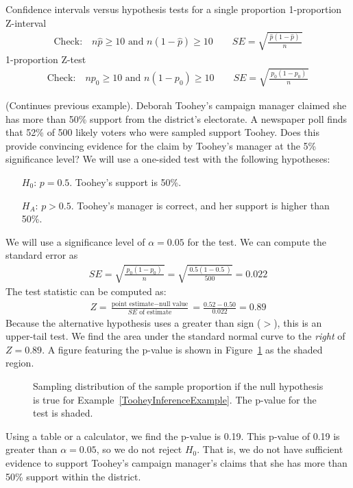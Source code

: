 \begin{onebox}{Confidence intervals versus hypothesis tests for a single proportion}
1-proportion Z-interval
\begin{align*}
\text{Check:}\quad n\hat{p}\ge 10 \text{ and }n(1-\hat{p})\ge 10 \qquad SE = \sqrt{\frac{\ \hat{p}(1-\hat{p})\ }{n}}
\end{align*}
1-proportion Z-test
\begin{align*}
\text{Check:}\quad  np_0\ge 10 \text{ and } n(1-p_0)\ge 10 \qquad SE = \sqrt{\frac{\ p_0(1-p_0)\ }{n}}
\end{align*}
\end{onebox}


\begin{examplewrap}
\begin{nexample}{(Continues previous example). Deborah Toohey's campaign manager claimed she has more than 50\% support from the district's electorate. A newspaper poll finds that 52\% of 500 likely voters who were sampled support Toohey. Does this provide convincing evidence for the claim by Toohey's manager at the 5\% significance level?}\label{TooheyInferenceExample}
We will use a one-sided test with the following hypotheses:
\begin{itemize}
\item[$H_0$:] $p = 0.5$. Toohey's support is 50\%.
\item[$H_A$:] $p > 0.5$. Toohey's manager is correct, and her support is higher than 50\%.
\end{itemize}
We will use a significance level of $\alpha = 0.05$ for the test. We can compute the standard error as
\begin{align*}
SE = \sqrt{\frac{\ p_0 (1 - p_0)\ }{n}} = \sqrt{\frac{\ 0.5 (1 - 0.5\ )}{500}} = 0.022
\end{align*}
The test statistic can be computed as:
\begin{align*}
Z =  \frac{\text{point estimate} - \text{null value}}{SE \text{ of estimate}} = \frac{0.52 - 0.50}{0.022} = 0.89
\end{align*}
Because the alternative hypothesis uses a greater than sign ($>$), this is an upper-tail test.  We find the area under the standard normal curve to the \emph{right} of $Z=0.89$.  A figure featuring the p-value is shown in Figure~\ref{pValueForCampaignManagerClaimOfMoreThan50PercentSupport} as the shaded region. 
\end{nexample}
\end{examplewrap}


\begin{figure}[h]
\centering
{}
\caption{Sampling distribution of the sample proportion if the null hypothesis is true for Example~\ref{TooheyInferenceExample}. The p-value for the test is shaded.}
\label{pValueForCampaignManagerClaimOfMoreThan50PercentSupport}
\end{figure}
Using a table or a calculator, we find the p-value is 0.19.  This p-value of 0.19 is greater than $\alpha = 0.05$, so we do not reject $H_0$. That is, we do not have sufficient  evidence to support Toohey's campaign manager's claims that she has more than 50\% support within the district.



